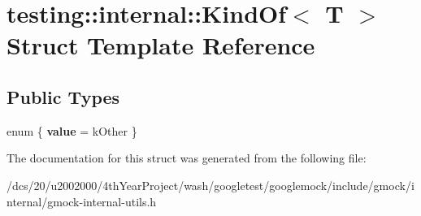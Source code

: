 \hypertarget{structtesting_1_1internal_1_1KindOf}{}\section{testing\+:\+:internal\+:\+:Kind\+Of$<$ T $>$ Struct Template Reference}
\label{structtesting_1_1internal_1_1KindOf}
\subsection*{Public Types}
\begin{DoxyCompactItemize}
\item 
\mbox{\label{structtesting_1_1internal_1_1KindOf_a4866389a4bc8d5522b5f8ae61a42f520}} 
enum \{ {\bfseries value} = k\+Other
 \}
\end{DoxyCompactItemize}


The documentation for this struct was generated from the following file\+:\begin{DoxyCompactItemize}
\item 
/dcs/20/u2002000/4th\+Year\+Project/wash/googletest/googlemock/include/gmock/internal/gmock-\/internal-\/utils.\+h\end{DoxyCompactItemize}
